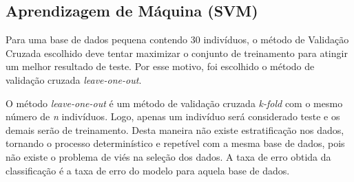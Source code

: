 % 
% 
% 


\subsection{Aprendizagem de Máquina (SVM)}

Para uma base de dados pequena contendo 30 indivíduos, o método de Validação Cruzada escolhido deve tentar maximizar o conjunto de treinamento para atingir um melhor resultado de teste. Por esse motivo, foi escolhido o método de validação cruzada \textit{leave-one-out}. 

O método \textit{leave-one-out} é um método de validação cruzada \textit{k-fold} com o mesmo número de \textit{n} indivíduos. Logo, apenas um indivíduo será considerado teste e os demais serão de treinamento. Desta maneira não existe estratificação nos dados, tornando o processo determinístico e repetível com a mesma base de dados, pois não existe o problema de viés na seleção dos dados. A taxa de erro obtida da classificação é a taxa de erro do modelo para aquela base de dados. 

